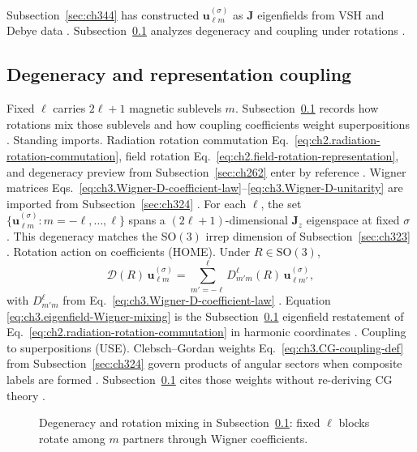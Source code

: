 Subsection~\ref{sec:ch344} has constructed \(\mathbf{u}_{\ell m}^{(\sigma)}\) as \(\mathbf{J}\) eigenfields from VSH
and Debye data . Subsection~\ref{sec:ch345} analyzes degeneracy and coupling
under rotations .
\subsection{Degeneracy and representation coupling}
\label{sec:ch345}
Fixed \(\ell\) carries \(2\ell+1\) magnetic sublevels \(m\). Subsection~\ref{sec:ch345} records how rotations mix
those sublevels and how coupling coefficients weight superpositions \cite{jackson1999}.
Standing imports. Radiation rotation commutation Eq.~\eqref{eq:ch2.radiation-rotation-commutation}, field rotation
Eq.~\eqref{eq:ch2.field-rotation-representation}, and degeneracy preview from Subsection~\ref{sec:ch262} enter by
reference \cite{stratton1941}. Wigner matrices
Eqs.~\eqref{eq:ch3.Wigner-D-coefficient-law}--\eqref{eq:ch3.Wigner-D-unitarity} are imported from
Subsection~\ref{sec:ch324} \cite{hansen1988}.
For each \(\ell\), the set \(\{\mathbf{u}_{\ell m}^{(\sigma)}:m=-\ell,\ldots,\ell\}\) spans a
\((2\ell+1)\)-dimensional \(\mathbf{J}_{z}\) eigenspace at fixed \(\sigma\) \cite{jackson1999}. This
degeneracy matches the SO\((3)\) irrep dimension of Subsection~\ref{sec:ch323} \cite{stratton1941}.
Rotation action on coefficients (HOME). Under \(R\in\mathrm{SO}(3)\),
\begin{equation}
\label{eq:ch3.eigenfield-Wigner-mixing}
\mathcal{D}(R)\,\mathbf{u}_{\ell m}^{(\sigma)}
=
\sum_{m'=-\ell}^{\ell}
D_{m'm}^{\ell}(R)\,\mathbf{u}_{\ell m'}^{(\sigma)},
\end{equation}
with \(D_{m'm}^{\ell}\) from Eq.~\eqref{eq:ch3.Wigner-D-coefficient-law} \cite{hansen1988}. Equation
\eqref{eq:ch3.eigenfield-Wigner-mixing} is the Subsection~\ref{sec:ch345} eigenfield restatement of
Eq.~\eqref{eq:ch2.radiation-rotation-commutation} in harmonic coordinates \cite{stratton1941}.
Coupling to superpositions (USE). Clebsch--Gordan weights Eq.~\eqref{eq:ch3.CG-coupling-def} from Subsection~\ref{sec:ch324} govern products of
angular sectors when composite labels are formed \cite{jackson1999}. Subsection~\ref{sec:ch345} cites
those weights without re-deriving CG theory \cite{hansen1988}.
\begin{figure}[t]
\centering
{}
\caption{Degeneracy and rotation mixing in Subsection~\ref{sec:ch345}: fixed \(\ell\) blocks rotate among
\(m\) partners through Wigner coefficients.}
\label{fig:ch3.degeneracy-wigner-mixing}
\end{figure}
